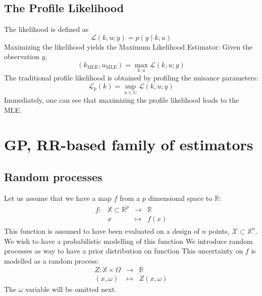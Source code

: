 \documentclass[a4paper,11pt]{article}
\newcommand{\Uspace}{\mathbb{U}}
\theoremstyle{defi}
\numberwithin{thmCounter}{section}
\begin{document}
\subsection{The Profile Likelihood}
\label{sec:prof_lik}
The likelihood is defined as
\begin{equation}
  \label{eq:lik_def}
  \mathcal{L}(k, u ; y) = p( y \mid k, u)
\end{equation}
Maximizing the likelihood yields the Maximum Likelihood Estimator:
Given the observation $y$,
\begin{equation}
  \label{eq:MLE}
  (k_{\mathrm{MLE}}, u_{\mathrm{MLE}}) = \max_{k,u} \mathcal{L}(k, u; y)
\end{equation}
The traditional profile likelihood is obtained by profiling the nuisance parameters:
\begin{equation}
  \label{eq:plik_def}
  \mathcal{L}_p(k) = \sup_{u\in\Uspace}\mathcal{L}(k, u; y)
\end{equation}
Immediately, one can see that maximizing the profile likelihood leads to the MLE.
\newpage
\section{GP, RR-based family of estimators}
\subsection{Random processes}
Let us assume that we have a map $f$ from a $p$ dimensional space to $\mathbb{R}$:
\begin{align}
  \begin{array}{rrcl}
    f: & \mathbb{X} \subset \mathbb{R}^p& \longrightarrow & \mathbb{R} \\
       & x & \longmapsto & f(x)
  \end{array}
\end{align}
This function is assumed to have been evaluated on a design of $n$ points, $\mathcal{X} \subset \mathbb{X}^n$. 
We wish to have a probabilistic modelling of this function
We introduce random processes as way to have a prior distribution on function
This uncertainty on $f$ is modelled as a random process:
\begin{equation}
  \begin{array}{rcl}
    Z: \mathbb{X} \times \Omega& \longrightarrow & \mathbb{R} \\
    (x,\omega) & \longmapsto & Z(x,\omega)
  \end{array}
\end{equation}
The $\omega$ variable will be omitted next.
\end{document}
